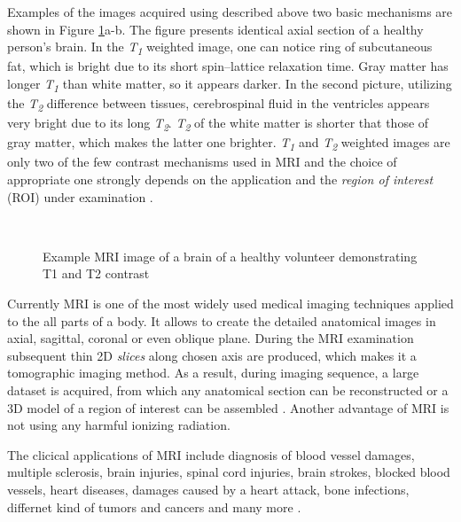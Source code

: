Examples of the images acquired using described above two basic mechanisms are shown in Figure \ref{fig:t1t2}a-b. 
The figure presents identical axial section of a healthy person's brain. In the \textit{T\textsubscript{1}} weighted  image, one can notice ring of subcutaneous fat, which is bright due to its short spin–lattice relaxation time. Gray matter has longer \textit{T\textsubscript{1}} than white matter, so it appears darker. In the second picture, utilizing the \textit{T\textsubscript{2}} difference between tissues, cerebrospinal fluid in the ventricles appears very bright due to its long  \textit{T\textsubscript{2}}. \textit{T\textsubscript{2}} of the white matter is shorter that those of gray matter, which makes the latter one brighter. \textit{T\textsubscript{1}} and \textit{T\textsubscript{2}} weighted images are only two of the few contrast mechanisms used in  MRI and the choice of appropriate one strongly depends on the application and the \textit{region of interest} (ROI) under examination \cite{biomedical_hanbook_imaging}.

 
\begin{figure}

\captionsetup[subfloat]{captionskip=0.5cm}
	\centering
	\hspace{1.5cm}
	\\	
\vspace{0.5cm}
\caption[Comparison of \textit{T\textsubscript{1}}- and \textit{T\textsubscript{2}}-weighted images]{Example MRI image of a brain of a healthy volunteer demonstrating T1 and T2 contrast \cite{t1t2brain}}
\label{fig:t1t2}
\end{figure}

Currently MRI is one of the most widely used medical imaging techniques applied to the all parts of a body. It allows to create the detailed anatomical images in axial, sagittal, coronal or even oblique plane. During the MRI examination subsequent thin 2D \textit{slices} along chosen axis are produced, which makes it a tomographic imaging method. As a result, during imaging sequence, a large dataset is acquired, from which any anatomical section can be reconstructed or a 3D model of a region of interest can be assembled \cite {bushong2014magnetic}. Another advantage of MRI is not using any harmful ionizing radiation.

The clicical applications of MRI include diagnosis of blood vessel damages, multiple sclerosis, brain injuries, spinal cord injuries, brain strokes, blocked blood vessels, heart diseases, damages caused by a heart attack, bone infections, differnet kind of tumors and cancers and many more \cite{mriApplications}.

